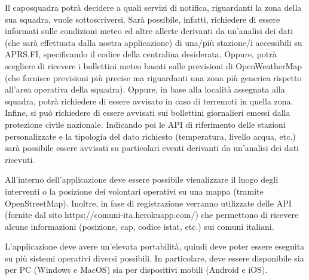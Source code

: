 Il caposquadra potrà decidere a quali servizi di notifica, riguardanti la zona della sua squadra, vuole sottoscriversi. Sarà possibile, infatti, richiedere di essere informati sulle condizioni meteo ed altre allerte derivanti da un’analisi dei dati (che sarà effettuata dalla nostra applicazione) di una/più stazione/i accessibili su APRS.FI, specificando il codice della centralina desiderata. Oppure, potrà scegliere di ricevere i bollettini meteo basati sulle previsioni di OpenWeatherMap (che fornisce previsioni più precise ma riguardanti una zona più generica rispetto all’area operativa della squadra). Oppure, in base alla località assegnata alla squadra, potrà richiedere di essere avvisato in caso di terremoti in quella zona. Infine, si può richiedere di essere avvisati sui bollettini giornalieri emessi dalla protezione civile nazionale. Indicando poi le API di riferimento delle stazioni personalizzate e la tipologia del dato richiesto (temperatura, livello acqua, etc.) sarà possibile essere avvisati su particolari eventi derivanti da un’analisi dei dati ricevuti. 

All’interno dell’applicazione deve essere possibile visualizzare il luogo degli interventi o la posizione dei volontari operativi su una mappa (tramite OpenStreetMap). Inoltre, in fase di registrazione verranno utilizzate delle API (fornite dal sito https://comuni-ita.herokuapp.com/) che permettono di ricevere alcune informazioni (posizione, cap, codice istat, etc.) sui comuni italiani.

L’applicazione deve avere un'elevata portabilità, quindi deve poter essere eseguita su più sistemi operativi diversi possibili. In particolare, deve essere disponibile sia per PC (Windows e MacOS) sia per dispositivi mobili (Android e iOS). 